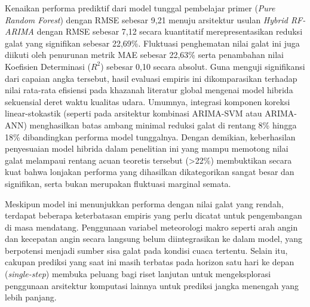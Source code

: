 Kenaikan performa prediktif dari model tunggal pembelajar primer (\textit{Pure Random Forest}) dengan RMSE sebesar 9,21 menuju arsitektur usulan \textit{Hybrid RF-ARIMA} dengan RMSE sebesar 7,12 secara kuantitatif merepresentasikan reduksi galat yang signifikan sebesar 22,69\%. Fluktuasi penghematan nilai galat ini juga diikuti oleh penurunan metrik MAE sebesar 22,63\% serta penambahan nilai Koefisien Determinasi ($R^2$) sebesar 0,10 secara absolut. Guna menguji signifikansi dari capaian angka tersebut, hasil evaluasi empiris ini dikomparasikan terhadap nilai rata-rata efisiensi pada khazanah literatur global mengenai model hibrida sekuensial deret waktu kualitas udara. Umumnya, integrasi komponen koreksi linear-stokastik (seperti pada arsitektur kombinasi ARIMA-SVM atau ARIMA-ANN) menghasilkan batas ambang minimal reduksi galat di rentang 8\% hingga 18\% dibandingkan performa model tunggalnya. Dengan demikian, keberhasilan penyesuaian model hibrida dalam penelitian ini yang mampu memotong nilai galat melampaui rentang acuan teoretis tersebut (>22\%) membuktikan secara kuat bahwa lonjakan performa yang dihasilkan dikategorikan sangat besar dan signifikan, serta bukan merupakan fluktuasi marginal semata.

Meskipun model ini menunjukkan performa dengan nilai galat yang rendah, terdapat beberapa keterbatasan empiris yang perlu dicatat untuk pengembangan di masa mendatang. Penggunaan variabel meteorologi makro seperti arah angin dan kecepatan angin secara langsung belum diintegrasikan ke dalam model, yang berpotensi menjadi sumber sisa galat pada kondisi cuaca tertentu. Selain itu, cakupan prediksi yang saat ini masih terbatas pada horizon satu hari ke depan (\textit{single-step}) membuka peluang bagi riset lanjutan untuk mengeksplorasi penggunaan arsitektur komputasi lainnya untuk prediksi jangka menengah yang lebih panjang.